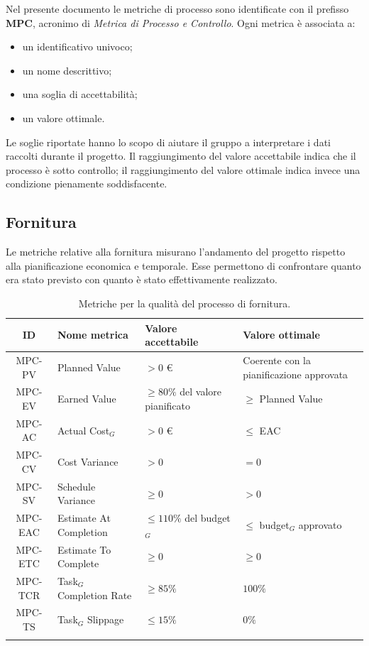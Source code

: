 \documentclass[a4paper, 10pt, colorlinks=true, linkcolor=black, urlcolor=blue, citecolor=blue, hidelinks]{article}
\begin{document}
Nel presente documento le metriche di processo sono identificate con il prefisso \textbf{MPC}, acronimo di \textit{Metrica di Processo e Controllo}. Ogni metrica è associata a:
\begin{itemize}
    \item un identificativo univoco;
    \item un nome descrittivo;
    \item una soglia di accettabilità;
    \item un valore ottimale.
\end{itemize}

Le soglie riportate hanno lo scopo di aiutare il gruppo a interpretare i dati raccolti durante il progetto. Il raggiungimento del valore accettabile indica che il processo è sotto controllo; il raggiungimento del valore ottimale indica invece una condizione pienamente soddisfacente.

\subsection{Fornitura}

Le metriche relative alla fornitura misurano l'andamento del progetto rispetto alla pianificazione economica e temporale. Esse permettono di confrontare quanto era stato previsto con quanto è stato effettivamente realizzato.

\begingroup
\small
\renewcommand{\arraystretch}{1.25}
\begin{longtable}{|c|p{4cm}|p{3cm}|p{3cm}|}
    \hline
    \textbf{ID} & \textbf{Nome metrica} & \textbf{Valore accettabile} & \textbf{Valore ottimale} \\
    \hline
    \endhead

    MPC-PV & Planned Value & $> 0$ € & Coerente con la pianificazione approvata \\ \hline
    MPC-EV & Earned Value & $\geq 80\%$ del valore pianificato & $\geq$ Planned Value \\ \hline
    MPC-AC & Actual Cost$_G$ & $> 0$ € & $\leq$ EAC \\ \hline
    MPC-CV & Cost Variance & $> 0$ & $= 0$ \\ \hline
    MPC-SV & Schedule Variance & $\geq 0$ & $> 0$ \\ \hline
    MPC-EAC & Estimate At Completion & $\leq 110\%$ del budget$_G$ & $\leq$ budget$_G$ approvato \\ \hline
    MPC-ETC & Estimate To Complete & $\geq 0$ & $\geq 0$ \\ \hline
    MPC-TCR & Task$_G$ Completion Rate & $\geq 85\%$ & $100\%$ \\ \hline
    MPC-TS & Task$_G$ Slippage & $\leq 15\%$ & $0\%$ \\ \hline

    \caption{Metriche per la qualità del processo di fornitura.}
    \label{tab:metriche-fornitura}
\end{longtable}
\endgroup
\end{document}
